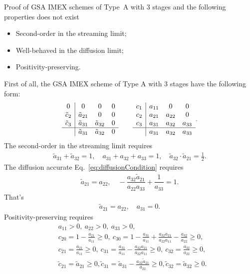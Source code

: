 Proof of GSA IMEX schemes of Type~A with 3 stages and the following properties does not exist
\begin{itemize}
  \item Second-order in the streaming limit;
  \item Well-behaved in the diffusion limit;
  \item Positivity-preserving.
\end{itemize}
First of all, the GSA IMEX scheme of Type A with 3 stages have the following form:
\begin{equation*}
  \begin{array}{c | c c c}
  	      0       & 0              & 0              & 0 \\
  	\tilde{c}_{2} & \tilde{a}_{21} & 0              & 0 \\
  	\tilde{c}_{3} & \tilde{a}_{31} & \tilde{a}_{32} & 0 \\ \hline
  	              & \tilde{a}_{31} & \tilde{a}_{32} & 0
  \end{array}
  \qquad
  \begin{array}{c | c c c}
    c_{1} & a_{11} & 0      & 0      \\
  	c_{2} & a_{21} & a_{22} & 0      \\
  	c_{3} & a_{31} & a_{32} & a_{33} \\ \hline
  	      & a_{31} & a_{32} & a_{33}
  \end{array}.
\end{equation*}
The second-order in the streaming limit requires
\begin{align*}
\tilde{a}_{31} + \tilde{a}_{32} = 1, \quad a_{31} + a_{32} + a_{33} = 1, \quad \tilde{a}_{32}\cdot \tilde{a}_{21} =  \frac{1}{2}.
\end{align*}
The diffusion accurate Eq.~\eqref{eq:diffusionCondition} requires 
\begin{align*}
\tilde{a}_{21} = a_{22}, \quad -\dfrac{a_{32} \tilde{a}_{21}}{a_{22}a_{33}} + \dfrac{1}{a_{33}} =1.
\end{align*}
That's 
\begin{align*}
\tilde{a}_{21} = a_{22}, \quad a_{31} = 0.
\end{align*}
Positivity-preserving requires
\begin{align*}
& a_{11} > 0, ~ a_{22} >0, ~ a_{33}>0,\\
& c_{20} = 1 - \frac{a_{21}}{a_{11}} \geq 0, ~ c_{30} = 1-\frac{a_{31}}{a_{11}} + \frac{a_{32}a_{21}}{a_{22}a_{11}} - \frac{a_{32}}{a_{22}}\geq 0, \\
& c_{21} = \frac{a_{21}}{a_{11}} \geq 0, ~ c_{31} = \frac{a_{31}}{a_{11}} - \frac{a_{32}a_{21}}{a_{22}a_{11}} \geq 0, ~ c_{32} = \frac{a_{32}}{a_{22}} \geq 0,\\
& \tilde{c}_{21} = \tilde{a}_{21} \geq 0, \tilde{c}_{31} = \tilde{a}_{31} - \frac{a_{32}\tilde{a}_{21}}{a_{22}} \geq 0, \tilde{c}_{32} = \tilde{a}_{32} \geq 0.
\end{align*}
